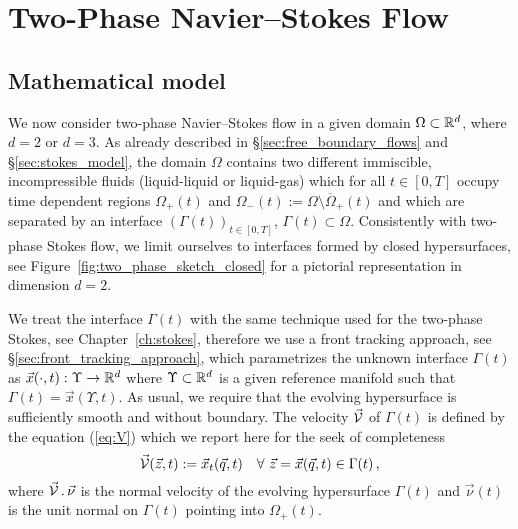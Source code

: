 \chapter{\sc Two-Phase Navier--Stokes Flow}\label{ch:navier_stokes}

\section{Mathematical model}\label{sec:navier_stokes_model}
We now consider two-phase Navier--Stokes flow in a given domain
$\Omega\subset{\mathbb R}^d$, where $d=2$ or $d=3$. As already described in
\S\ref{sec:free_boundary_flows} and \S\ref{sec:stokes_model}, the domain
$\Omega$ contains two different immiscible, incompressible fluids
(liquid-liquid or liquid-gas) which for all $t\in[0,T]$ occupy time
dependent regions $\Omega_+(t)$ and
$\Omega_-(t):=\Omega\setminus\overline{\Omega}_+(t)$ and which are separated by
an interface $(\Gamma(t))_{t\in[0,T]}$, $\Gamma(t)\subset\Omega$.
Consistently with two-phase Stokes flow, we limit ourselves to interfaces
formed by closed hypersurfaces, see Figure~\ref{fig:two_phase_sketch_closed}
for a pictorial representation in dimension $d=2$.

We treat the interface $\Gamma(t)$ with the same technique used for the
two-phase Stokes, see Chapter~\ref{ch:stokes}, therefore we use a front tracking
approach, see \S\ref{sec:front_tracking_approach}, which parametrizes the
unknown interface $\Gamma(t)$ as $\vec x(\cdot,t):\Upsilon\to{\mathbb R}^d$ where
$\Upsilon\subset{\mathbb R}^d$ is a given reference manifold such that $\Gamma(t) = \vec
x(\Upsilon,t)$. As usual, we require that the evolving hypersurface is
sufficiently smooth and without boundary. The velocity $\vec{\mathcal{V}}$ of $\Gamma(t)$ is
defined by the equation (\ref{eq:V}) which we report here for the seek of
completeness
\begin{equation*}
\vec{\mathcal{V}}(\vec z, t) := \vec x_t(\vec q, t) \quad
\forall\ \vec z = \vec x(\vec q,t) \in \Gamma(t)\,,
\end{equation*}
where $\vec{\mathcal{V}} \,.\,\vec{\nu}$ is the normal velocity of the evolving hypersurface
$\Gamma(t)$ and $\vec\nu(t)$ is the unit normal on $\Gamma(t)$ pointing into
$\Omega_+(t)$.

